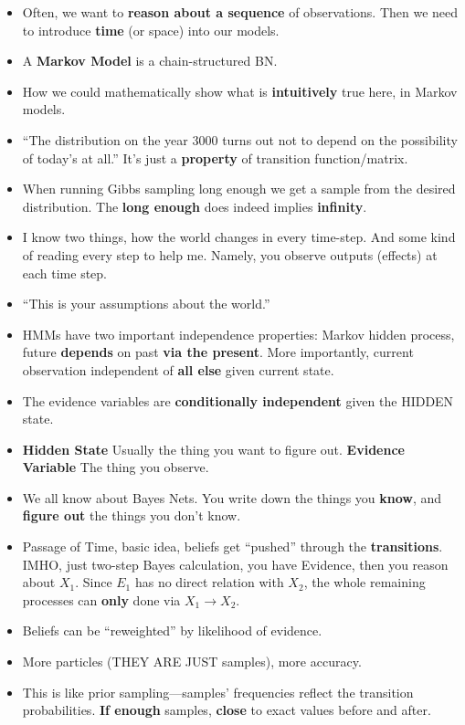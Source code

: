 \documentclass[twocolumn]{article}
\begin{document}
\begin{itemize}
\item Often, we want to \textbf{reason about a sequence} of
  observations. Then we need to introduce \textbf{time} (or space)
  into our models.
\item A \textbf{Markov Model} is a chain-structured BN.
\item How we could mathematically show what is \textbf{intuitively}
  true here, in Markov models.
\item ``The distribution on the year 3000 turns out not to depend on
  the possibility of today's at all.'' It's just a \textbf{property} of
  transition function/matrix.
\item When running Gibbs sampling long enough we get a sample from the
  desired distribution. The \textbf{long enough} does indeed implies
  \textbf{infinity}. 
\item I know two things, how the world changes in every time-step. And
  some kind of reading every step to help me. Namely, you observe
  outputs (effects) at each time step.
\item ``This is your assumptions about the world.''
\item HMMs have two important independence properties: Markov hidden
  process, future \textbf{depends} on past \textbf{via the
    present}. More importantly, current observation independent of
  \textbf{all else} given current state.
\item The evidence variables are \textbf{conditionally independent}
  given the HIDDEN state.
\item \textbf{Hidden State} Usually the thing you want to figure
  out. \textbf{Evidence Variable} The thing you observe.
\item We all know about Bayes Nets. You write down the things you
  \textbf{know}, and \textbf{figure out} the things you don't know.
\item Passage of Time, basic idea, beliefs get ``pushed'' through the
  \textbf{transitions}. IMHO, just two-step Bayes calculation, you
  have Evidence, then you reason about $X_{1}$. Since $E_{1}$ has no
  direct relation with $X_{2}$, the whole remaining processes can
  \textbf{only} done via $X_{1}\rightarrow X_{2}$.
\item Beliefs can be ``reweighted'' by likelihood of evidence.
\item More particles (THEY ARE JUST samples), more accuracy.
\item This is like prior sampling---samples' frequencies reflect the
  transition probabilities. \textbf{If enough} samples, \textbf{close}
  to exact values before and after.
\end{itemize}
\end{document}
